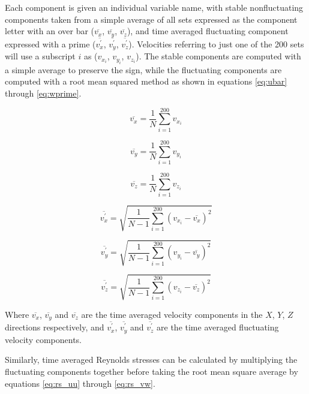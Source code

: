 Each component is given an individual variable name, with stable nonfluctuating 
components taken from a simple average of all sets expressed as the component 
letter with an over bar ($\overline{v_x}$, $\overline{v_y}$, $\overline{v_z}$), 
and 
time averaged fluctuating component expressed with a prime 
($\overline{v_x^\prime}$, $\overline{v_y^\prime}$, $\overline{v_z^\prime}$). 
Velocities referring to just one of the 200 sets will use a 
subscript $i$ as ($v_{x_i}$, $v_{y_i}$, $v_{z_i}$). The stable components are 
computed with 
a simple average to preserve the sign, while the fluctuating components are 
computed with a root mean squared method as shown in equations \ref{eq:ubar} 
through \ref{eq:wprime}.

\begin{equation}
\overline{v_x}  = \frac{1}{N} \sum_{i=1}^{200} v_{x_i}
\label{eq:ubar}
\end{equation}

\begin{equation}
\overline{v_y}  = \frac{1}{N} \sum_{i=1}^{200} v_{y_i}
\end{equation}

\begin{equation}
\overline{v_z}  = \frac{1}{N} \sum_{i=1}^{200} v_{z_i}
\end{equation}

\begin{equation}
\overline{v_x^\prime} = \sqrt{\frac{1}{N-1} \sum_{i=1}^{200} (v_{x_i} - 
\overline{v_x})^2}
\end{equation}

\begin{equation}
\overline{v_y^\prime} = \sqrt{\frac{1}{N-1} \sum_{i=1}^{200} (v_{y_i} - 
	\overline{v_y})^2}
\end{equation}

\begin{equation}
\overline{v_z^\prime} = \sqrt{\frac{1}{N-1} \sum_{i=1}^{200} (v_{z_i} - 
	\overline{v_z})^2}
\label{eq:wprime}
\end{equation}

Where $\overline{v_x}$, $\overline{v_y}$ and $\overline{v_z}$ are the time 
averaged velocity 
components in the $X$, $Y$, $Z$ directions respectively, and  
$\overline{v_x^\prime}$, $\overline{v_y^\prime}$ and $\overline{v_z^\prime}$ 
are the time averaged fluctuating velocity components.

Similarly, time averaged Reynolds stresses can be calculated by multiplying the 
fluctuating components together before taking the root mean square average by 
equations \ref{eq:rs_uu} through \ref{eq:rs_vw}.

